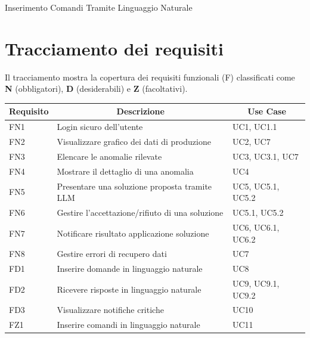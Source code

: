 \begin{usecase}{11}{Inserimento Comandi Tramite Linguaggio Naturale}
\label{uc:uc11_comandi_nl}
\end{usecase}

\section{Tracciamento dei requisiti}
Il tracciamento mostra la copertura dei requisiti funzionali (F) classificati come
\textbf{N} (obbligatori), \textbf{D} (desiderabili) e \textbf{Z} (facoltativi).

\begin{center}
  \brandTableColors
  \begin{longtable}{|p{2.25cm}|p{7.75cm}|p{2.25cm}|}
    \hline
    \multicolumn{1}{|c|}{\textbf{Requisito}} &
    \multicolumn{1}{c|}{\textbf{Descrizione}} &
    \multicolumn{1}{c|}{\textbf{Use Case}}\\
    \hline
    FN1 & Login sicuro dell'utente                                    & UC1, UC1.1 \\ \hline
    FN2 & Visualizzare grafico dei dati di produzione                 & UC2, UC7   \\ \hline
    FN3 & Elencare le anomalie rilevate                               & UC3, UC3.1, UC7 \\ \hline
    FN4 & Mostrare il dettaglio di una anomalia                       & UC4        \\ \hline
    FN5 & Presentare una soluzione proposta tramite LLM               & UC5, UC5.1, UC5.2 \\ \hline
    FN6 & Gestire l'accettazione/rifiuto di una soluzione             & UC5.1, UC5.2 \\ \hline
    FN7 & Notificare risultato applicazione soluzione                 & UC6, UC6.1, UC6.2 \\ \hline
    FN8 & Gestire errori di recupero dati                             & UC7        \\ \hline
    FD1 & Inserire domande in linguaggio naturale                     & UC8        \\ \hline
    FD2 & Ricevere risposte in linguaggio naturale                    & UC9, UC9.1, UC9.2 \\ \hline
    FD3 & Visualizzare notifiche critiche                             & UC10       \\ \hline
    FZ1 & Inserire comandi in linguaggio naturale                     & UC11       \\ \hline
  \end{longtable}
  \label{tab:requisiti_fun}
\end{center}

